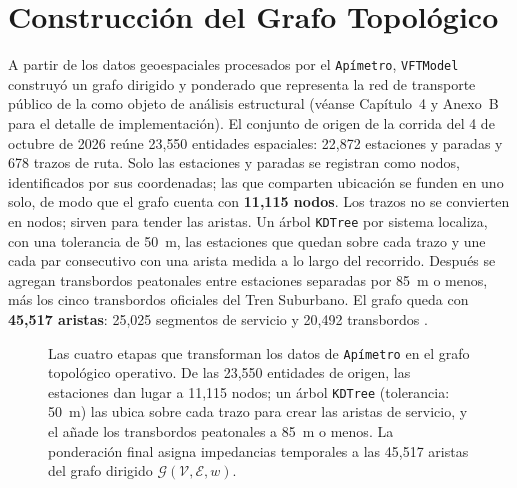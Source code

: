 \section{Construcción del Grafo Topológico}
\label{sec:grafo-topologico}

A partir de los datos geoespaciales procesados por el \texttt{Apímetro},
\texttt{VFTModel} construyó un grafo dirigido y ponderado que representa la
red de transporte público de la \zmvm{} como objeto de análisis estructural
(véanse Capítulo~4 y Anexo~B para el detalle de implementación). El conjunto de
origen de la corrida del 4 de octubre de 2026 reúne 23{,}550 entidades
espaciales: 22{,}872 estaciones y paradas y 678 trazos de ruta. Solo las
estaciones y paradas se registran como nodos, identificados por sus coordenadas;
las que comparten ubicación se funden en uno solo, de modo que el grafo cuenta
con \textbf{11{,}115 nodos}. Los trazos no se convierten en nodos; sirven para
tender las aristas. Un árbol \texttt{KDTree} por sistema localiza, con una
tolerancia de 50~m, las estaciones que quedan sobre cada trazo y une cada par
consecutivo con una arista medida a lo largo del recorrido. Después se agregan
transbordos peatonales entre estaciones separadas por 85~m o menos, más los
cinco transbordos oficiales del Tren Suburbano. El grafo queda con
\textbf{45{,}517 aristas}: 25{,}025 segmentos de servicio y 20{,}492 transbordos
\citep{cabrera2026VFTModel}.

\begin{figure}[H]
    \centering
    
    \caption[Pipeline de procesamiento de \texttt{VFTModel}]{Las cuatro etapas que
    transforman los datos de \texttt{Apímetro} en el grafo topológico
    operativo. De las 23{,}550 entidades de origen, las estaciones dan lugar a
    11{,}115 nodos; un árbol \texttt{KDTree} (tolerancia: 50~m) las ubica sobre
    cada trazo para crear las aristas de servicio, y el  añade los transbordos peatonales a 85~m o menos. La
    ponderación final asigna impedancias temporales a las 45{,}517 aristas del
    grafo dirigido $\mathcal{G}(\mathcal{V},\mathcal{E},w)$.}
    \label{fig:arq-capas}
\end{figure}

